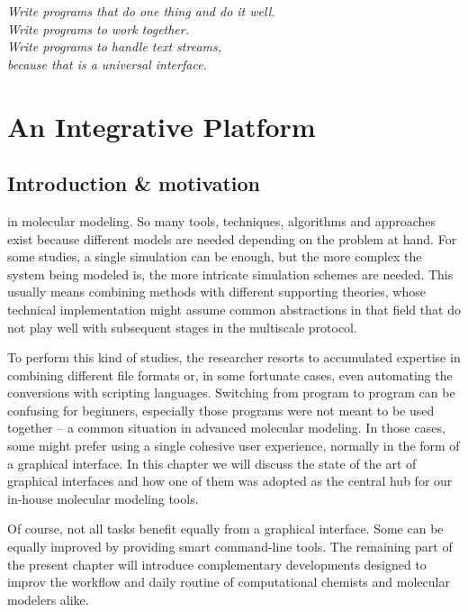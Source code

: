 \begin{savequote}[75mm]
	\itshape Write programs that do one thing and do it well. \\
	\itshape Write programs to work together. \\
	\itshape Write programs to handle text streams, \\
	\itshape because that is a universal interface.
\end{savequote}

\chapter{An Integrative Platform}
\label{chap:05}

\section{Introduction \& motivation}
 in molecular modeling. So many tools, techniques, algorithms and approaches exist because different models are needed depending on the problem at hand. For some studies, a single simulation can be enough, but the more complex the system being modeled is, the more intricate simulation schemes are needed. This usually means combining methods with different supporting theories, whose technical implementation might assume common abstractions in that field that do not play well with subsequent stages in the multiscale protocol.

To perform this kind of studies, the researcher resorts to accumulated expertise in combining different file formats or, in some fortunate cases, even automating the conversions with scripting languages. Switching from program to program can be confusing for beginners, especially those programs were not meant to be used together – a common situation in advanced molecular modeling. In those cases, some might prefer using a single cohesive user experience, normally in the form of a graphical interface. In this chapter we will discuss the state of the art of graphical interfaces and how one of them was adopted as the central hub for our in-house molecular modeling tools.

Of course, not all tasks benefit equally from a graphical interface. Some can be equally improved by providing smart command-line tools. The remaining part of the present chapter will introduce complementary developments designed to improv the workflow and daily routine of computational chemists and molecular modelers alike.

